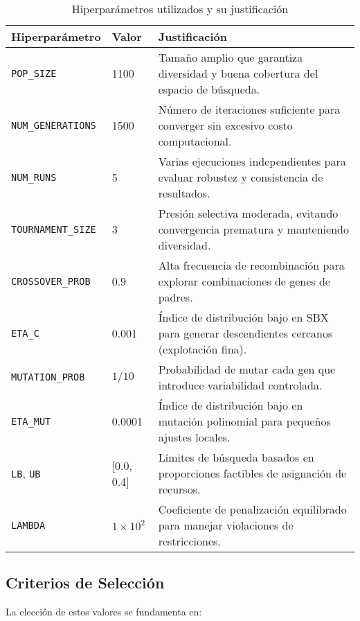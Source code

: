 \begin{table}[H]
\centering
\caption{Hiperparámetros utilizados y su justificación}
\begin{tabular}{llp{8cm}}
\toprule
\textbf{Hiperparámetro} & \textbf{Valor} & \textbf{Justificación} \\
\midrule
\texttt{POP\_SIZE}           & 1100                & Tamaño amplio que garantiza diversidad y buena cobertura del espacio de búsqueda. \\
\texttt{NUM\_GENERATIONS}    & 1500                & Número de iteraciones suficiente para converger sin excesivo costo computacional. \\
\texttt{NUM\_RUNS}           & 5                   & Varias ejecuciones independientes para evaluar robustez y consistencia de resultados. \\
\texttt{TOURNAMENT\_SIZE}     & 3                   & Presión selectiva moderada, evitando convergencia prematura y manteniendo diversidad. \\
\texttt{CROSSOVER\_PROB}      & 0.9                 & Alta frecuencia de recombinación para explorar combinaciones de genes de padres. \\
\texttt{ETA\_C}               & 0.001               & Índice de distribución bajo en SBX para generar descendientes cercanos (explotación fina). \\
\texttt{MUTATION\_PROB}       & $1/10$              & Probabilidad de mutar cada gen que introduce variabilidad controlada. \\
\texttt{ETA\_MUT}             & 0.0001              & Índice de distribución bajo en mutación polinomial para pequeños ajustes locales. \\
\texttt{LB}, \texttt{UB}      & [0.0,\,0.4]         & Límites de búsqueda basados en proporciones factibles de asignación de recursos. \\
\texttt{LAMBDA}               & $1\times10^2$       & Coeficiente de penalización equilibrado para manejar violaciones de restricciones. \\
\bottomrule
\end{tabular}
\end{table}

\newpage

\subsection{Criterios de Selección}
La elección de estos valores se fundamenta en:

